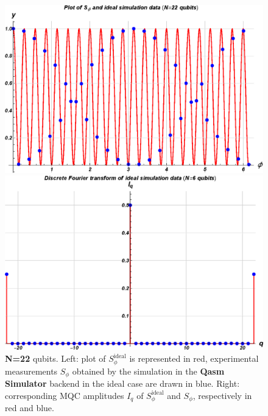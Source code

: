 \begin{figure}[h!]
\begin{minipage}[c]{0.5\linewidth}
\hspace{1cm}
\centering \includegraphics[width=1\textwidth]{./chapter3/graphics_IBM/simulation/22S.eps}
\end{minipage}
\begin{minipage}[]{0.5\linewidth}
\centering \includegraphics[width=1\textwidth]{./chapter3/graphics_IBM/simulation/22I.eps}
\end{minipage}
\caption{\label{IdealSimulation6}\textbf{N=22} qubits. Left:  plot of $S_{\phi}^{\text{ideal}}$ is represented in red, experimental measurements $S_{\phi}$ obtained by the simulation in the \textbf{Qasm Simulator} backend in the ideal case are drawn in blue. Right: corresponding MQC amplitudes $I_q$ of $S_\phi^{\text{ideal}}$ and $S_\phi$, respectively in red and blue.}
\end{figure}

